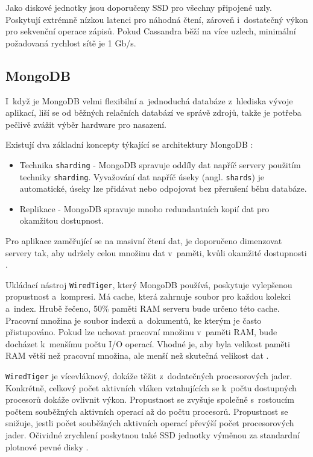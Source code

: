 Jako diskové jednotky jsou doporučeny SSD pro všechny připojené uzly. Poskytují extrémně nízkou latenci pro náhodná čtení, zároveň i~dostatečný výkon pro sekvenční operace zápisů. Pokud Cassandra běží na více uzlech, minimální požadovaná rychlost sítě je 1 Gb/s.

\subsection{MongoDB}
I~když je MongoDB velmi flexibilní a~jednoduchá databáze z~hlediska vývoje aplikací, liší se od běžných relačních databází ve správě zdrojů, takže je potřeba pečlivě zvážit výběr hardware pro nasazení.

Existují dva základní koncepty týkající se architektury MongoDB \cite{hwProvisioningMongoDB}:

\begin{itemize}
    \item Technika \texttt{sharding} - MongoDB spravuje oddíly dat napříč servery použitím techniky \texttt{sharding}. Vyvažování dat napříč úseky (angl. \texttt{shards}) je automatické, úseky lze přidávat nebo odpojovat bez přerušení běhu databáze.
    
    \item Replikace - MongoDB spravuje mnoho redundantních kopií dat pro okamžitou dostupnost.
\end{itemize}

\noindent Pro aplikace zaměřující se na masivní čtení dat, je doporučeno dimenzovat servery tak, aby udržely celou množinu dat v~paměti, kvůli okamžité dostupnosti \cite{hwProvisioningMongoDB}.

Ukládací nástroj \texttt{WiredTiger}, který MongoDB používá, poskytuje vylepšenou propustnost a~kompresi. Má cache, která zahrnuje soubor pro každou kolekci a~index. Hrubě řečeno, 50\% paměti RAM serveru bude určeno této cache. Pracovní množina je soubor indexů a~dokumentů, ke kterým je často přistupováno. Pokud lze uchovat pracovní množinu v~paměti RAM, bude docházet k~menšímu počtu I/O operací. Vhodné je, aby byla velikost paměti RAM větší než pracovní množina, ale menší než skutečná velikost dat \cite{sizeYourMongoDBClusters}.

\texttt{WiredTiger} je vícevláknový, dokáže těžit z~dodatečných procesorových jader. Konkrétně, celkový počet aktivních vláken vztahujících se k~počtu dostupných procesorů dokáže ovlivnit výkon. Propustnost se zvyšuje společně s~rostoucím počtem souběžných aktivních operací až do počtu procesorů. Propustnost se snižuje, jestli počet souběžných aktivních operací převýší počet procesorových jader. Očividné zrychlení poskytnou také SSD jednotky výměnou za standardní plotnové pevné disky \cite{mongoDBProductionNotes}.

